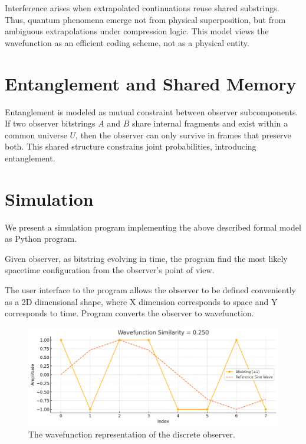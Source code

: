 \documentclass[12pt]{article}
\begin{document}
Interference arises when extrapolated continuations reuse shared substrings. Thus, quantum phenomena emerge not from physical superposition, but from ambiguous extrapolations under compression logic. This model views the wavefunction as an efficient coding scheme, not as a physical entity.

\section{Entanglement and Shared Memory}

Entanglement is modeled as mutual constraint between observer subcomponents. If two observer bitstrings $A$ and $B$ share internal fragments and exist within a common universe $U$, then the observer can only survive in frames that preserve both. This shared structure constrains joint probabilities, introducing entanglement.


\section{Simulation}

We present a simulation program implementing the above described formal model as Python program.

Given observer, as bitstring evolving in time, the program find the most likely spacetime configuration from the observer's point of view.

The user interface to the program allows the observer to be defined conveniently as a
2D dimensional shape, where X dimension corresponds to space and Y corresponds to time.
Program converts the observer to wavefunction.

\begin{figure}[h!]
    \centering
    \includegraphics[width=1.0\textwidth]{figures/wavefunction_similarity.png}
    \caption{The wavefunction representation of the discrete observer.}
    \label{fig:wavefunction_similarity}
\end{figure}
\end{document}
